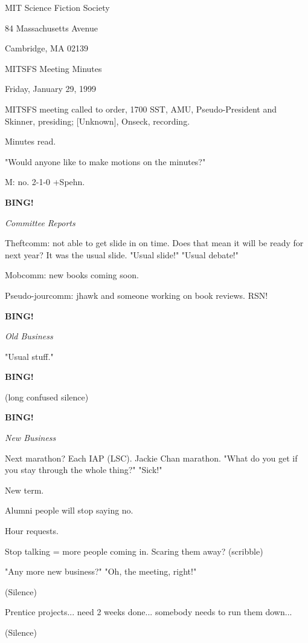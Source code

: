 \documentclass[12pt]{article}
\newcommand{\bing}{{\bf BING!} }
\newcommand{\goto}[1]{\bing \vskip 12pt \centerline{{\em{#1}}}}
\begin{document}
\begin{center}

MIT Science Fiction Society 

84 Massachusetts Avenue

Cambridge, MA 02139

\vspace{12pt}

MITSFS Meeting Minutes 

Friday, January 29, 1999

\end{center}
 
\vspace{18pt}

\setlength{\parskip}{6pt}

\noindent
MITSFS meeting called to order, 1700 SST,
AMU, Pseudo-President and Skinner, presiding; [Unknown], Onseck, recording.

Minutes read.

"Would anyone like to make motions on the minutes?"

M: no. 2-1-0 +Spehn.

\goto{Committee Reports}

Theftcomm: not able to get slide in on time. Does that mean it will be ready for next year? It was the usual slide. "Usual slide!" "Usual debate!"

Mobcomm: new books coming soon.

Pseudo-jourcomm: jhawk and someone working on book reviews. RSN!

\goto{Old Business}

"Usual stuff."

\bing

(long confused silence)

\goto{New Business}

Next marathon? Each IAP (LSC). Jackie Chan marathon. "What do you get if you stay through the whole thing?" "Sick!"

New term.

Alumni people will stop saying no.

Hour requests.

Stop talking = more people coming in. Scaring them away? (scribble)

"Any more new business?" "Oh, the meeting, right!"

(Silence)

Prentice projects... need 2 weeks done... somebody needs to run them down...

(Silence)
\end{document}
